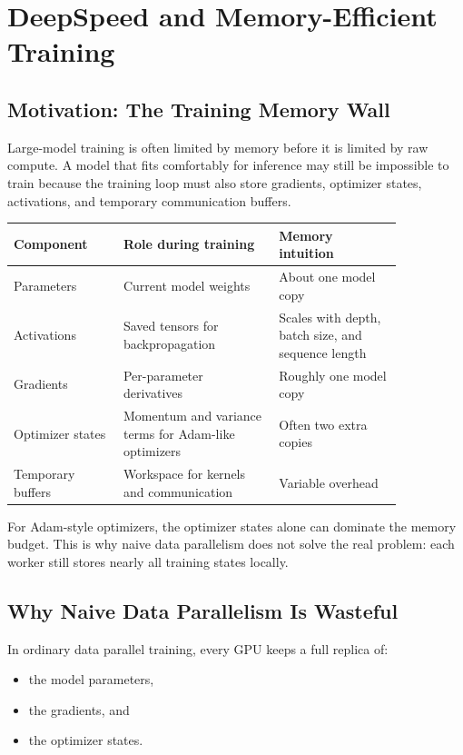 \documentclass[class=article,crop=false]{standalone}
\begin{document}
\section{DeepSpeed and Memory-Efficient Training}
\label{sec:deepspeed}

\subsection{Motivation: The Training Memory Wall}
\label{sec:deepspeed:motivation}

Large-model training is often limited by memory before it is limited by raw compute. A model that fits comfortably for inference may still be impossible to train because the training loop must also store gradients, optimizer states, activations, and temporary communication buffers.

\begin{center}
\small
\begin{tabular}{p{0.24\linewidth} p{0.34\linewidth} p{0.27\linewidth}}
\toprule
Component & Role during training & Memory intuition \\
\midrule
Parameters & Current model weights & About one model copy \\
Activations & Saved tensors for backpropagation & Scales with depth, batch size, and sequence length \\
Gradients & Per-parameter derivatives & Roughly one model copy \\
Optimizer states & Momentum and variance terms for Adam-like optimizers & Often two extra copies \\
Temporary buffers & Workspace for kernels and communication & Variable overhead \\
\bottomrule
\end{tabular}
\end{center}

For Adam-style optimizers, the optimizer states alone can dominate the memory budget. This is why naive data parallelism does not solve the real problem: each worker still stores nearly all training states locally.

\subsection{Why Naive Data Parallelism Is Wasteful}
\label{sec:deepspeed:dp}

In ordinary data parallel training, every GPU keeps a full replica of:
\begin{itemize}
  \item the model parameters,
  \item the gradients, and
  \item the optimizer states.
\end{itemize}
\end{document}
